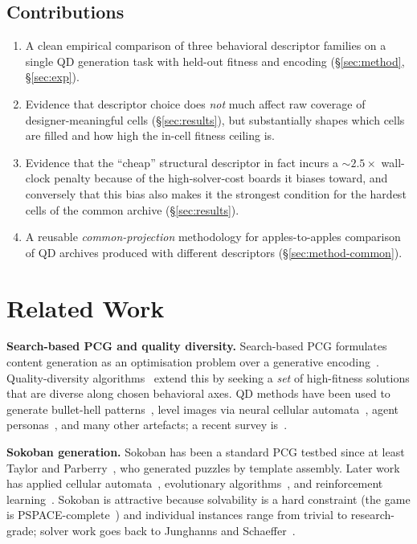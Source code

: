 \documentclass[conference]{IEEEtran}
\begin{document}
\subsection*{Contributions}
\begin{enumerate}
    \item A clean empirical comparison of three behavioral descriptor
    families on a single QD generation task with held-out fitness and
    encoding (\S\ref{sec:method}, \S\ref{sec:exp}).
    \item Evidence that descriptor choice does \emph{not} much affect
    raw coverage of designer-meaningful cells (\S\ref{sec:results}),
    but substantially shapes which cells are filled and how high the
    in-cell fitness ceiling is.
    \item Evidence that the ``cheap'' structural descriptor in fact
    incurs a $\sim 2.5\times$ wall-clock penalty because of the
    high-solver-cost boards it biases toward, and conversely that
    this bias also makes it the strongest condition for the hardest
    cells of the common archive (\S\ref{sec:results}).
    \item A reusable \emph{common-projection} methodology for
    apples-to-apples comparison of QD archives produced with
    different descriptors (\S\ref{sec:method-common}).
\end{enumerate}

\section{Related Work}
\label{sec:related}

\textbf{Search-based PCG and quality diversity.} Search-based PCG
formulates content generation as an optimisation problem over a
generative encoding~\cite{togelius2011sbpcg, shaker2014pcgbook}.
Quality-diversity algorithms~\cite{lehman2011novelty,
mouret2015illuminating, cully2017qd, fontaine2020cma} extend this by
seeking a \emph{set} of high-fitness solutions that are diverse along
chosen behavioral axes. QD methods have been used to generate bullet-hell
patterns~\cite{khalifa2018talakat}, level
images via neural cellular automata~\cite{earle2022illuminating},
agent personas~\cite{holmgard2014personas}, and many other artefacts;
a recent survey is~\cite{gravina2019pcgsurvey}.

\textbf{Sokoban generation.} Sokoban has been a standard PCG testbed
since at least Taylor and Parberry~\cite{taylor2011sokoban}, who
generated puzzles by template assembly. Later work has applied
cellular automata~\cite{murofushi2018sokoban}, evolutionary
algorithms~\cite{kowalski2023sokoban}, and reinforcement
learning~\cite{khalifa2020pcgrl}. Sokoban is attractive because
solvability is a hard constraint (the game is
PSPACE-complete~\cite{culberson1999sokoban}) and individual
instances range from trivial to research-grade; solver work goes
back to Junghanns and Schaeffer~\cite{junghanns2001sokoban}.
\end{document}
